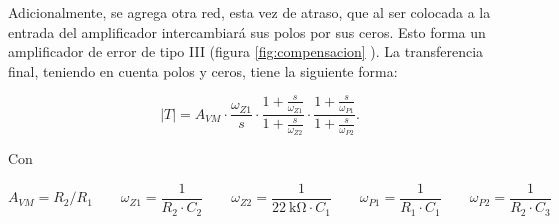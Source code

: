 \documentclass[]{article}
\begin{document}
	Adicionalmente, se agrega otra red, esta vez de atraso, que al ser colocada a la entrada del amplificador intercambiará sus polos por sus ceros. Esto forma un amplificador de error de tipo III (figura \ref{fig:compensacion} ). La transferencia final, teniendo en cuenta polos y ceros, tiene la siguiente forma:
	
	\begin{equation}
		|T| = A_{VM} \cdot \frac{\omega_{Z1}}{s} \cdot \frac{1+ \frac{s}{\omega_{Z1}}}{1+ \frac{s}{\omega_{Z2}}} \cdot \frac{1+ \frac{s}{\omega_{P1}}}{1+ \frac{s}{\omega_{P2}}}.
	\end{equation}
	
	Con 
	
	\begin{equation}
		A_{VM} = R_{2}/R_1 \qquad \omega_{Z1} = \frac{1}{R_2 \cdot C_2} \qquad \omega_{Z2} = \frac{1}{\SI{22}{\kilo\ohm} \cdot C_1} \qquad \omega_{P1} = \frac{1}{R_1 \cdot C_1} \qquad \omega_{P2} = \frac{1}{R_2 \cdot C_3}
	\end{equation}
	
\end{document}
